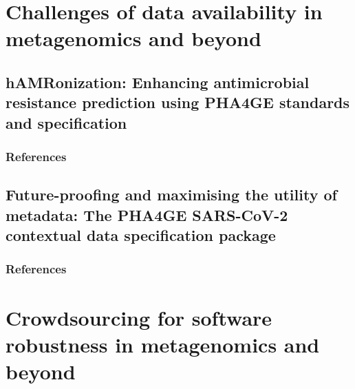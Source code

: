 \documentclass[12pt,a4paper,twoside,openright]{book}
\begin{document}
\begin{sloppy}
\part{Challenges of data availability in metagenomics and beyond}
\newpage
\thispagestyle{empty}
\chapter{hAMRonization: Enhancing antimicrobial resistance prediction using PHA4GE standards and specification\label{ch:paper5}}

\thispagestyle{empty}
\clearpage \thispagestyle{empty}\mbox{}\clearpage
\newpage
\begin{refsection}

\newpage
\section{References}
\printbibliography[heading=none]
\end{refsection}

\newpage
\thispagestyle{empty}
\chapter{Future-proofing and maximising the utility of metadata: The PHA4GE SARS-CoV-2 contextual data specification package\label{ch:paper6}}

\thispagestyle{empty}
\clearpage \thispagestyle{empty}\mbox{}\clearpage
\newpage
\begin{refsection}

\newpage
\section{References}
\printbibliography[heading=none]
\end{refsection}

\part{Crowdsourcing for software robustness in metagenomics and beyond}
\newpage
\thispagestyle{empty}

\end{sloppy}
\end{document}
